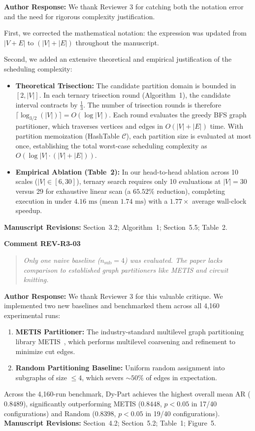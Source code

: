 \documentclass[11pt,a4paper]{article}
\newcommand{\commentbox}[2]{
    \vspace{0.8em}
    \noindent\textbf{\textcolor{commentcolor}{#1}}
    \vspace{0.2em}
    \begin{quote}
        \small\itshape #2
    \end{quote}
}
\newcommand{\responsebox}[1]{
    \noindent\textbf{\textcolor{responsecolor}{Author Response:}} #1
    \vspace{0.8em}
}
\begin{document}
\responsebox{We thank Reviewer 3 for catching both the notation error and the need for rigorous complexity justification.

First, we corrected the mathematical notation: the expression was updated from $|V+E|$ to $(|V| + |E|)$ throughout the manuscript.

Second, we added an extensive theoretical and empirical justification of the scheduling complexity:
\begin{itemize}[noitemsep]
    \item \textbf{Theoretical Trisection:} The candidate partition domain is bounded in $[2, |V|]$. In each ternary trisection round (Algorithm~1), the candidate interval contracts by $\frac{1}{3}$. The number of trisection rounds is therefore $\lceil \log_{3/2}(|V|) \rceil = O(\log |V|)$. Each round evaluates the greedy BFS graph partitioner, which traverses vertices and edges in $O(|V| + |E|)$ time. With partition memoization (HashTable $\mathcal{C}$), each partition size is evaluated at most once, establishing the total worst-case scheduling complexity as $O(\log |V| \cdot (|V| + |E|))$.
    \item \textbf{Empirical Ablation (Table~2):} In our head-to-head ablation across 10 scales ($|V| \in [6, 30]$), ternary search requires only 10 evaluations at $|V|=30$ versus 29 for exhaustive linear scan (a $65.52\%$ reduction), completing execution in under $4.16\text{ ms}$ (mean $1.74\text{ ms}$) with a $1.77\times$ average wall-clock speedup.
\end{itemize}
\textbf{Manuscript Revisions:} Section~3.2; Algorithm~1; Section~5.5; Table~2.}

\commentbox{Comment REV-R3-03}{Only one naive baseline ($n_{\text{sub}}=4$) was evaluated. The paper lacks comparison to established graph partitioners like METIS and circuit knitting.}

\responsebox{We thank Reviewer 3 for this valuable critique. We implemented two new baselines and benchmarked them across all 4,160 experimental runs:
\begin{enumerate}[noitemsep]
    \item \textbf{METIS Partitioner:} The industry-standard multilevel graph partitioning library METIS~\cite{Karypis1998}, which performs multilevel coarsening and refinement to minimize cut edges.
    \item \textbf{Random Partitioning Baseline:} Uniform random assignment into subgraphs of size $\le 4$, which severs $\sim 50\%$ of edges in expectation.
\end{enumerate}
Across the 4,160-run benchmark, Dy-Part achieves the highest overall mean AR ($0.8489$), significantly outperforming METIS ($0.8448$, $p < 0.05$ in 17/40 configurations) and Random ($0.8398$, $p < 0.05$ in 19/40 configurations).
\\[0.3em]
\textbf{Manuscript Revisions:} Section~4.2; Section~5.2; Table~1; Figure~5.}
\end{document}
